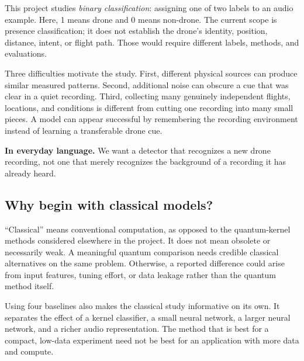 \documentclass[11pt,letterpaper]{article}
\newcommand{\plain}[1]{\par\smallskip\noindent\textbf{In everyday language.} #1\par\smallskip}
\begin{document}
This project studies \emph{binary classification}: assigning one of two labels
to an audio example. Here, 1 means drone and 0 means non-drone. The current
scope is presence classification; it does not establish the drone's identity,
position, distance, intent, or flight path. Those would require different
labels, methods, and evaluations.

Three difficulties motivate the study. First, different physical sources can
produce similar measured patterns. Second, additional noise can obscure a cue
that was clear in a quiet recording. Third, collecting many genuinely
independent flights, locations, and conditions is different from cutting one
recording into many small pieces. A model can appear successful by remembering
the recording environment instead of learning a transferable drone cue.

\plain{We want a detector that recognizes a new drone recording, not one that
merely recognizes the background of a recording it has already heard.}

\subsection{Why begin with classical models?}
``Classical'' means conventional computation, as opposed to the quantum-kernel
methods considered elsewhere in the project. It does not mean obsolete or
necessarily weak. A meaningful quantum comparison needs credible classical
alternatives on the same problem. Otherwise, a reported difference could arise
from input features, tuning effort, or data leakage rather than the quantum
method itself.

Using four baselines also makes the classical study informative on its own.
It separates the effect of a kernel classifier, a small neural network, a
larger neural network, and a richer audio representation. The method that is
best for a compact, low-data experiment need not be best for an application
with more data and compute.
\end{document}
